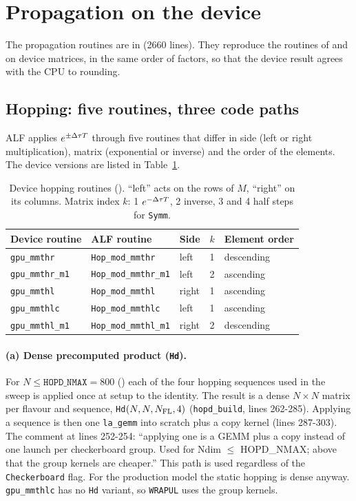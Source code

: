 \section{Propagation on the device}
\label{sec:wrap}

The propagation routines are in  (2660 lines). They reproduce the routines of  and  on device matrices, in the same order of factors, so that the device result agrees with the CPU to rounding.

\subsection{Hopping: five routines, three code paths}

ALF applies $e^{\pm\Delta\tau T}$ through five routines that differ in side (left or right multiplication), matrix (exponential or inverse) and the order of the elements. The device versions are listed in Table~\ref{tab:hop}.

\begin{table}[h]
\centering\small
\caption{Device hopping routines (). ``left'' acts on the rows of $M$, ``right'' on its columns. Matrix index $k$: 1 $e^{-\Delta\tau T}$, 2 inverse, 3 and 4 half steps for \texttt{Symm}.}
\label{tab:hop}
\begin{tabular}{@{}lllll@{}}
\toprule
Device routine & ALF routine & Side & $k$ & Element order \\
\midrule
\texttt{gpu\_mmthr} & \texttt{Hop\_mod\_mmthr} & left & 1 & descending \\
\texttt{gpu\_mmthr\_m1} & \texttt{Hop\_mod\_mmthr\_m1} & left & 2 & ascending \\
\texttt{gpu\_mmthl} & \texttt{Hop\_mod\_mmthl} & right & 1 & ascending \\
\texttt{gpu\_mmthlc} & \texttt{Hop\_mod\_mmthlc} & left & 1 & ascending \\
\texttt{gpu\_mmthl\_m1} & \texttt{Hop\_mod\_mmthl\_m1} & right & 2 & descending \\
\bottomrule
\end{tabular}
\end{table}

\paragraph{(a) Dense precomputed product (\texttt{Hd}).} For $N\le\texttt{HOPD\_NMAX}=800$ () each of the four hopping sequences used in the sweep is applied once at setup to the identity. The result is a dense $N\times N$ matrix per flavour and sequence, \texttt{Hd}$(N,N,N_{\rm FL},4)$ (\texttt{hopd\_build}, lines 262-285). Applying a sequence is then one \texttt{la\_gemm} into scratch plus a copy kernel (lines 287-303). The comment at lines 252-254: ``applying one is a GEMM plus a copy instead of one launch per checkerboard group. Used for Ndim $\le$ HOPD\_NMAX; above that the group kernels are cheaper.'' This path is used regardless of the \texttt{Checkerboard} flag. For the production model the static hopping is dense anyway. \texttt{gpu\_mmthlc} has no \texttt{Hd} variant, so \texttt{WRAPUL} uses the group kernels.

